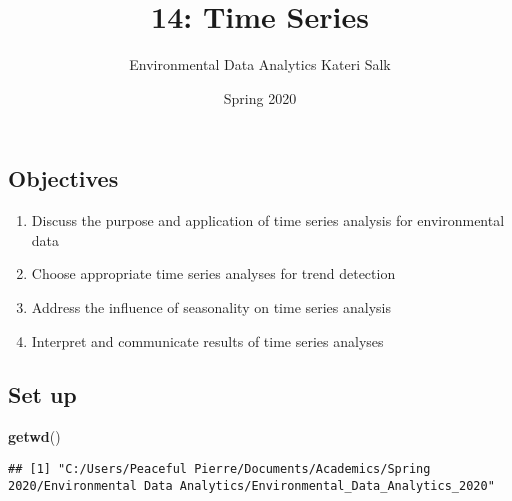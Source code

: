\documentclass[
]{article}
\title{14: Time Series}
\author{Environmental Data Analytics \textbar{} Kateri Salk}
\date{Spring 2020}
\newenvironment{Shaded}{\begin{snugshade}}{\end{snugshade}}
\newcommand{\KeywordTok}[1]{\textcolor[rgb]{0.13,0.29,0.53}{\textbf{#1}}}
\newcommand{\NormalTok}[1]{#1}
\providecommand{\tightlist}{%
  \setlength{\itemsep}{0pt}\setlength{\parskip}{0pt}}
\begin{document}
\maketitle

\hypertarget{objectives}{%
\subsection{Objectives}\label{objectives}}

\begin{enumerate}
\def\labelenumi{\arabic{enumi}.}
\tightlist
\item
  Discuss the purpose and application of time series analysis for
  environmental data
\item
  Choose appropriate time series analyses for trend detection
\item
  Address the influence of seasonality on time series analysis
\item
  Interpret and communicate results of time series analyses
\end{enumerate}

\hypertarget{set-up}{%
\subsection{Set up}\label{set-up}}

\begin{Shaded}
\begin{Highlighting}[]
\KeywordTok{getwd}\NormalTok{()}
\end{Highlighting}
\end{Shaded}

\begin{verbatim}
## [1] "C:/Users/Peaceful Pierre/Documents/Academics/Spring 2020/Environmental Data Analytics/Environmental_Data_Analytics_2020"
\end{verbatim}
\end{document}
